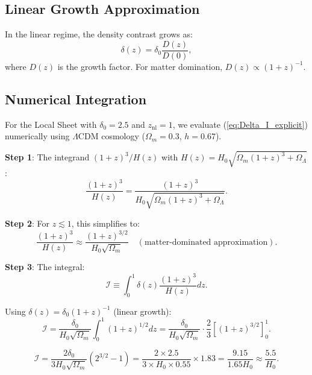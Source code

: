 \documentclass[12pt, a4paper]{article}
\begin{document}
\subsection{Linear Growth Approximation}

In the linear regime, the density contrast grows as:
\begin{equation}
    \delta(z) = \delta_0 \frac{D(z)}{D(0)},
\end{equation}
where $D(z)$ is the growth factor. For matter domination, $D(z) \propto (1+z)^{-1}$.

\subsection{Numerical Integration}

For the Local Sheet with $\delta_0 = 2.5$ and $z_{\text{nl}} = 1$, we evaluate (\ref{eq:Delta_I_explicit}) numerically using $\Lambda$CDM cosmology ($\Omega_m = 0.3$, $h = 0.67$).

\textbf{Step 1}: The integrand $(1+z)^3 / H(z)$ with $H(z) = H_0 \sqrt{\Omega_m(1+z)^3 + \Omega_\Lambda}$:
\begin{equation}
    \frac{(1+z)^3}{H(z)} = \frac{(1+z)^3}{H_0 \sqrt{\Omega_m(1+z)^3 + \Omega_\Lambda}}.
\end{equation}

\textbf{Step 2}: For $z \lesssim 1$, this simplifies to:
\begin{equation}
    \frac{(1+z)^3}{H(z)} \approx \frac{(1+z)^{3/2}}{H_0 \sqrt{\Omega_m}} \quad (\text{matter-dominated approximation}).
\end{equation}

\textbf{Step 3}: The integral:
\begin{equation}
    \mathcal{I} \equiv \int_0^1 \delta(z) \frac{(1+z)^3}{H(z)} dz.
\end{equation}

Using $\delta(z) = \delta_0 (1+z)^{-1}$ (linear growth):
\begin{equation}
    \mathcal{I} = \frac{\delta_0}{H_0 \sqrt{\Omega_m}} \int_0^1 (1+z)^{1/2} dz = \frac{\delta_0}{H_0 \sqrt{\Omega_m}} \cdot \frac{2}{3}\left[(1+z)^{3/2}\right]_0^1.
\end{equation}

\begin{equation}
    \mathcal{I} = \frac{2\delta_0}{3 H_0 \sqrt{\Omega_m}} \left(2^{3/2} - 1\right) = \frac{2 \times 2.5}{3 \times H_0 \times 0.55} \times 1.83 = \frac{9.15}{1.65 H_0} \approx \frac{5.5}{H_0}.
\end{equation}
\end{document}
